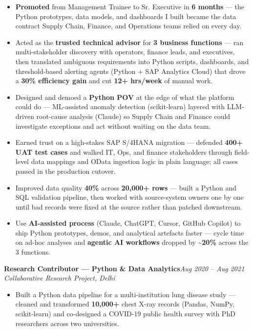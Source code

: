 \documentclass[10pt, letterpaper]{article}
\newcommand{\role}[3]{%
  \vspace{2pt}%
  {\bfseries #1}\hfill{\small\color{muted}\textit{#3}}\\[-2pt]%
  {\small\color{muted}\textit{#2}}%
}
\begin{document}
\begin{itemize}
  \item \textbf{Promoted} from Management Trainee to Sr. Executive in \textbf{6 months} --- the Python prototypes, data models, and dashboards I built became the data contract Supply Chain, Finance, and Operations teams relied on every day.
  \item Acted as the \textbf{trusted technical advisor} for \textbf{3 business functions} --- ran multi-stakeholder discovery with operators, finance leads, and executives, then translated ambiguous requirements into Python scripts, dashboards, and threshold-based alerting agents (Python + SAP Analytics Cloud) that drove a \textbf{30\% efficiency gain} and cut \textbf{12+ hrs/week} of manual work.
  \item Designed and demoed a \textbf{Python POV} at the edge of what the platform could do --- ML-assisted anomaly detection (scikit-learn) layered with LLM-driven root-cause analysis (Claude) so Supply Chain and Finance could investigate exceptions and act without waiting on the data team.
  \item Earned trust on a high-stakes SAP S/4HANA migration --- defended \textbf{400+ UAT test cases} and walked IT, Ops, and finance stakeholders through field-level data mappings and OData ingestion logic in plain language; all cases passed in the production cutover.
  \item Improved data quality \textbf{40\%} across \textbf{20,000+ rows} --- built a Python and SQL validation pipeline, then worked with source-system owners one by one until bad records were fixed at the source rather than patched downstream.
  \item Use \textbf{AI-assisted process} (Claude, ChatGPT, Cursor, GitHub Copilot) to ship Python prototypes, demos, and analytical artefacts faster --- cycle time on ad-hoc analyses and \textbf{agentic AI workflows} dropped by \textbf{\textasciitilde20\%} across the 3 functions.
\end{itemize}

\vspace{1pt}

\role{Research Contributor --- Python \& Data Analytics}{Collaborative Research Project, Delhi}{Aug 2020 -- Aug 2021}

\begin{itemize}
  \item Built a Python data pipeline for a multi-institution lung disease study --- cleaned and transformed \textbf{10,000+} chest X-ray records (Pandas, NumPy, scikit-learn) and co-designed a COVID-19 public health survey with PhD researchers across two universities.
\end{itemize}
\end{document}
